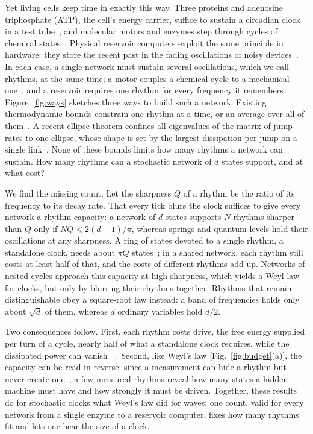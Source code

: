 \documentclass[aps,prl,twocolumn,superscriptaddress,amsmath,amssymb,floatfix,longbibliography]{revtex4-2}
\newcommand{\SMsec}[1]{\cite[Sec.~\ref{#1}]{SM}}
\begin{document}
Yet living cells keep time in exactly this way. Three proteins and adenosine triphosphate (ATP), the cell's energy carrier, suffice to sustain a circadian clock in a test tube~\cite{nakajima2005}, and molecular motors and enzymes step through cycles of chemical states~\cite{cao2015,liepelt2007,seifert2012,barato2016}. Physical reservoir computers exploit the same principle in hardware: they store the recent past in the fading oscillations of noisy devices~\cite{jaeger2004,maass2002,tanaka2019,hermans2010,sheldon2022,ehlers2025}. In each case, a single network must sustain several oscillations, which we call rhythms, at the same time; a motor couples a chemical cycle to a mechanical one~\cite{liepelt2007}, and a reservoir requires one rhythm for every frequency it remembers~\cite{hermans2010}~\SMsec{sec:reservoir}. Figure~\ref{fig:ways} sketches three ways to build such a network. Existing thermodynamic bounds constrain one rhythm at a time, or an average over all of them~\cite{kolchinsky2024,kolchinsky2026winding,barato2017,ohga2023,uhl2019,verbeken2026,xumeng2026,oberreiter2022,santolin2025,gu2026,kolchinsky2026elementary,shiraishi2026}. A recent ellipse theorem confines all eigenvalues of the matrix of jump rates to one ellipse, whose shape is set by the largest dissipation per jump on a single link~\cite{xu2025}. None of these bounds limits how many rhythms a network can sustain. How many rhythms can a stochastic network of $d$ states support, and at what cost?

We find the missing count. Let the sharpness $Q$ of a rhythm be the ratio of its frequency to its decay rate. That every tick blurs the clock suffices to give every network a rhythm capacity: a network of $d$ states supports $N$ rhythms sharper than $Q$ only if $NQ<2(d-1)/\pi$, whereas springs and quantum levels hold their oscillations at any sharpness. A ring of states devoted to a single rhythm, a standalone clock, needs about $\pi Q$ states~\cite{dmitriev1946,karpelevich1951}; in a shared network, each rhythm still costs at least half of that, and the costs of different rhythms add up. Networks of nested cycles approach this capacity at high sharpness, which yields a Weyl law for clocks, but only by blurring their rhythms together. Rhythms that remain distinguishable obey a square-root law instead: a band of frequencies holds only about $\sqrt d$ of them, whereas $d$ ordinary variables hold $d/2$.

Two consequences follow. First, each rhythm costs drive, the free energy supplied per turn of a cycle, nearly half of what a standalone clock requires, while the dissipated power can vanish~\cite{shiraishi2026}~\SMsec{sec:rate}. Second, like Weyl's law [Fig.~\ref{fig:budget}(a)], the capacity can be read in reverse: since a measurement can hide a rhythm but never create one~\SMsec{sec:inference}, a few measured rhythms reveal how many states a hidden machine must have and how strongly it must be driven. Together, these results do for stochastic clocks what Weyl's law did for waves: one count, valid for every network from a single enzyme to a reservoir computer, fixes how many rhythms fit and lets one hear the size of a clock.
\end{document}
